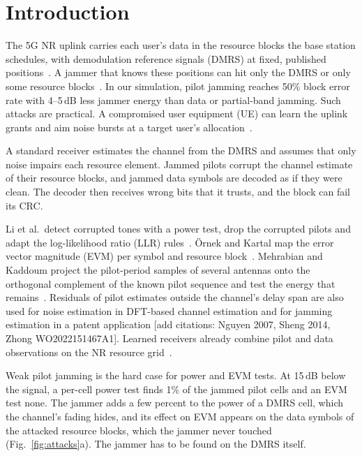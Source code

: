 \documentclass[conference]{IEEEtran}
\newcommand{\note}[1]{{\color{red}\footnotesize[#1]}}
\newenvironment{conly}{\par\color{Conly}}{\par}
\begin{document}
\section{Introduction}

The 5G NR uplink carries each user's data in the resource blocks the base station schedules,
with demodulation reference signals (DMRS) at fixed, published positions~\cite{gpp20265g}. A
jammer that knows these positions can hit only the DMRS or only some resource
blocks~\cite{clancy2011efficient,lichtman20185g}. In our simulation, pilot jamming reaches 50\%
block error rate with 4--5\,dB less jammer energy than data or partial-band jamming. Such attacks
are practical. A compromised user equipment (UE) can learn the uplink grants and aim noise bursts
at a target user's allocation~\cite{alaimo2025exploiting,alaimo2026when}.

A standard receiver estimates the channel from the DMRS and assumes that only noise impairs each
resource element. Jammed pilots corrupt the channel estimate of their resource blocks, and jammed
data symbols are decoded as if they were clean. The decoder then receives wrong bits that it
trusts, and the block can fail its CRC.

Li et al.\ detect corrupted tones with a power test, drop the corrupted pilots and adapt the
log-likelihood ratio (LLR) rules~\cite{li2012robust}. \"Ornek and Kartal map the error vector
magnitude (EVM) per symbol and resource block~\cite{ornek2024advanced}. Mehrabian and Kaddoum
project the pilot-period samples of several antennas onto the orthogonal complement of the known
pilot sequence and test the energy that remains~\cite{mehrabian2026robust}. Residuals of pilot
estimates outside the channel's delay span are also used for noise estimation in DFT-based channel
estimation and for jamming estimation in a patent application \note{add citations: Nguyen 2007,
Sheng 2014, Zhong WO2022151467A1}. Learned receivers already combine pilot and data observations on
the NR resource grid~\cite{honkala2021deeprx}.

\begin{conly}
Weak pilot jamming is the hard case for power and EVM tests. At 15\,dB below the signal, a per-cell
power test finds 1\% of the jammed pilot cells and an EVM test none. The jammer adds a few percent
to the power of a DMRS cell, which the channel's fading hides, and its effect on EVM appears on the
data symbols of the attacked resource blocks, which the jammer never touched (Fig.~\ref{fig:attacks}a).
The jammer has to be found on the DMRS itself.
\end{conly}
\end{document}
